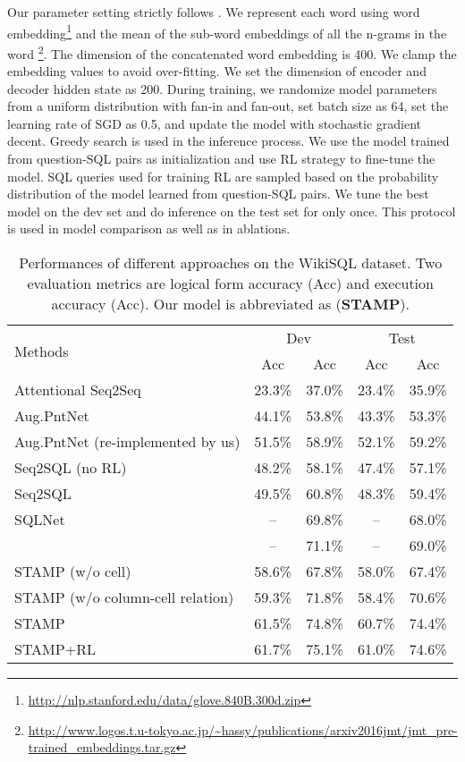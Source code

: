 \documentclass[11pt,a4paper]{article}
\begin{document}
Our parameter setting strictly follows .
We represent each word using word embedding\footnote{\url{http://nlp.stanford.edu/data/glove.840B.300d.zip}} \cite{pennington-socher-manning:2014:EMNLP2014} and the mean of the sub-word embeddings of all the n-grams in the word  \cite{hashimoto2016joint}\footnote{\url{http://www.logos.t.u-tokyo.ac.jp/~hassy/publications/arxiv2016jmt/jmt_pre-trained_embeddings.tar.gz}}.
The dimension of the concatenated word embedding is 400.
We clamp the embedding values to avoid over-fitting.
We set the dimension of encoder and decoder hidden state as 200.
During training, we randomize model parameters from a uniform distribution with fan-in and fan-out, set batch size as 64, set the learning rate of SGD as 0.5, and update the model with stochastic gradient decent.
Greedy search is used in the inference process.
We use the model trained from question-SQL pairs as initialization and use RL strategy to fine-tune the model.
SQL queries used for training RL are sampled based on the probability distribution of the model learned from question-SQL pairs.
We tune the best model on the dev set and do inference on the test set for only once.
This protocol is used in model comparison as well as in ablations. 


\begin{table*}[t]
\centering
	\begin{tabular}{l|cc|cc}
		\hline
		\multirow{2}{*}{{Methods}} & \multicolumn{2}{c|}{Dev} & \multicolumn{2}{c}{Test} \\
		\cline{2-5}
		& {Acc} & {Acc} & {Acc} & {Acc}\\
		\hline
Attentional Seq2Seq & 23.3\%& 37.0\%& 23.4\%& 35.9\% \\
Aug.PntNet~\cite{zhong2017seq2sql} & 44.1\%& 53.8\%& 43.3\%& 53.3\% \\
		Aug.PntNet (re-implemented by us) &51.5\%& 58.9\%& 52.1\%& 59.2\% \\
Seq2SQL (no RL)~\cite{zhong2017seq2sql} &  48.2\%& 58.1\%& 47.4\% &57.1\% \\
Seq2SQL~\cite{zhong2017seq2sql} & 49.5\%& 60.8\%& 48.3\%& 59.4\%\\
SQLNet~\cite{xu2017sqlnet} & -- & 69.8\% & -- & 68.0\%\\
		\newcite{DBLP:journals/corr/abs-1801-00076} & -- & 71.1\%& -- & 69.0\%\\
\hline


		STAMP (w/o cell)& 58.6\%& 67.8\%& 58.0\%& 67.4\%\\
		STAMP (w/o column-cell relation) & 59.3\%& 71.8\%& 58.4\%& 70.6\%\\
		STAMP  & 61.5\%& 74.8\%& 60.7\%& 74.4\% \\
		STAMP+RL& 61.7\%&  75.1\%& 61.0\%&  74.6\%\\
\hline
	\end{tabular}
	\caption{Performances of different approaches on the WikiSQL dataset. Two evaluation metrics are logical form accuracy (Acc) and execution accuracy (Acc).
		Our model is abbreviated as (\textbf{STAMP}).}
\label{table:compare-to-other-alg}
\end{table*}
\end{document}
